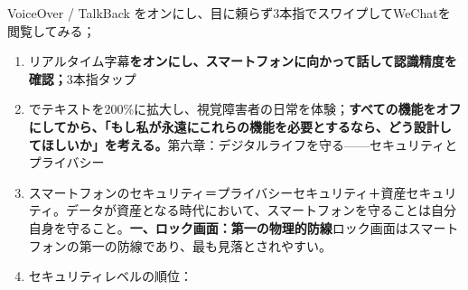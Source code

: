 \begin{tcbpractice}{VoiceOver / TalkBack}
をオンにし、目に頼らず3本指でスワイプしてWeChatを閲覧してみる；

\begin{enumerate}
  \item リアルタイム字幕\textbf{をオンにし、スマートフォンに向かって話して認識精度を確認；}3本指タップ
  \item でテキストを200\%に拡大し、視覚障害者の日常を体験；\textbf{すべての機能をオフにしてから、「もし私が永遠にこれらの機能を必要とするなら、どう設計してほしいか」を考える。}第六章：デジタルライフを守る——セキュリティとプライバシー
  \item スマートフォンのセキュリティ＝プライバシーセキュリティ＋資産セキュリティ。データが資産となる時代において、スマートフォンを守ることは自分自身を守ること。\textbf{一、ロック画面：第一の物理的防線}ロック画面はスマートフォンの第一の防線であり、最も見落とされやすい。
  \item セキュリティレベルの順位：
\end{enumerate}

\end{tcbpractice}
